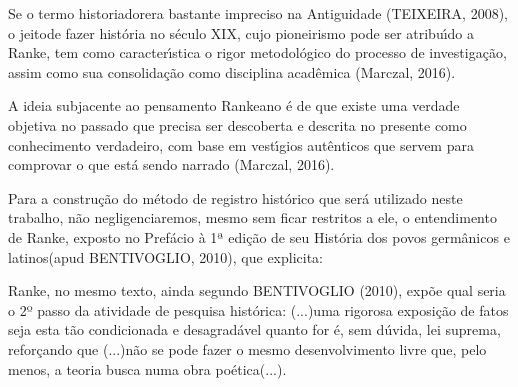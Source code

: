 \documentclass[
12pt,		%
openright,	%
twoside,  %
a4paper,			%
chapter=TITLE,		%
english,			%
french,				%
spanish,			%
brazil				%
]{USPSC-classe/USPSC}
\begin{document}
Se o termo \textquotedbl historiador\textquotedbl  era bastante impreciso na Antiguidade (TEIXEIRA, 2008), o \textquotedbl jeito\textquotedbl  de fazer hist\'oria no s\'eculo XIX, cujo pioneirismo pode ser atribu\'{\i}do a Ranke, tem como caracter\'{\i}stica \textquotedbl o rigor metodol\'ogico do processo de investiga\c{c}\~ao\textquotedbl , assim como sua consolida\c{c}\~ao como disciplina acad\^emica (Marczal, 2016).










A ideia subjacente ao pensamento Rankeano \'e de que existe uma verdade objetiva no passado que precisa ser descoberta e descrita no presente como \textquotedbl conhecimento verdadeiro\textquotedbl , com base em vest\'{\i}gios aut\^enticos que servem para comprovar o que est\'a sendo narrado (Marczal, 2016).










Para a constru\c{c}\~ao do m\'etodo de registro hist\'orico que ser\'a utilizado neste trabalho, n\~ao negligenciaremos, mesmo sem ficar restritos a ele, o entendimento de Ranke, exposto no Pref\'acio \`a 1ª edi\c{c}\~ao de seu \textquotedbl Hist\'oria dos povos germ\^anicos e latinos\textquotedbl   (apud BENTIVOGLIO, 2010), que explicita:











\noindent\begin{center}\mbox{\centering{}}\end{center}


Ranke, no mesmo texto, ainda segundo  BENTIVOGLIO (2010), exp\~oe qual seria o 2º passo da atividade de pesquisa hist\'orica: \textquotedbl (...)uma rigorosa exposi\c{c}\~ao de fatos seja esta t\~ao condicionada e desagrad\'avel quanto for \'e, sem d\'uvida, lei suprema\textquotedbl , refor\c{c}ando que \textquotedbl (...)n\~ao se pode fazer o mesmo desenvolvimento livre que, pelo menos, a teoria busca numa obra po\'etica(...)\textquotedbl .
\end{document}
